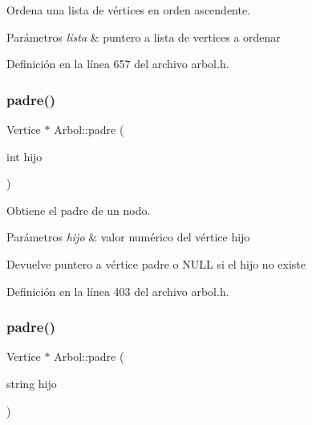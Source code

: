 Ordena una lista de vértices en orden ascendente. 


\begin{DoxyParams}{Parámetros}
{\em lista} & puntero a lista de vertices a ordenar \\
\hline
\end{DoxyParams}


Definición en la línea 657 del archivo arbol.\+h.

\mbox{\label{classArbol_abcb8c26e9021a1418de71ad6014351cf}} 
\subsubsection{\texorpdfstring{padre()}{padre()}\hspace{0.1cm}{\footnotesize\ttfamily [1/3]}}
{\footnotesize\ttfamily Vertice $\ast$ Arbol\+::padre (\begin{DoxyParamCaption}\item[{int}]{hijo }\end{DoxyParamCaption})}



Obtiene el padre de un nodo. 


\begin{DoxyParams}{Parámetros}
{\em hijo} & valor numérico del vértice hijo \\
\hline
\end{DoxyParams}
\begin{DoxyReturn}{Devuelve}
puntero a vértice padre o N\+U\+LL si el hijo no existe 
\end{DoxyReturn}


Definición en la línea 403 del archivo arbol.\+h.

\mbox{\label{classArbol_a53527e7a8999ceda0b8a0fa25a3f357c}} 
\subsubsection{\texorpdfstring{padre()}{padre()}\hspace{0.1cm}{\footnotesize\ttfamily [2/3]}}
{\footnotesize\ttfamily Vertice $\ast$ Arbol\+::padre (\begin{DoxyParamCaption}\item[{string}]{hijo }\end{DoxyParamCaption})}



